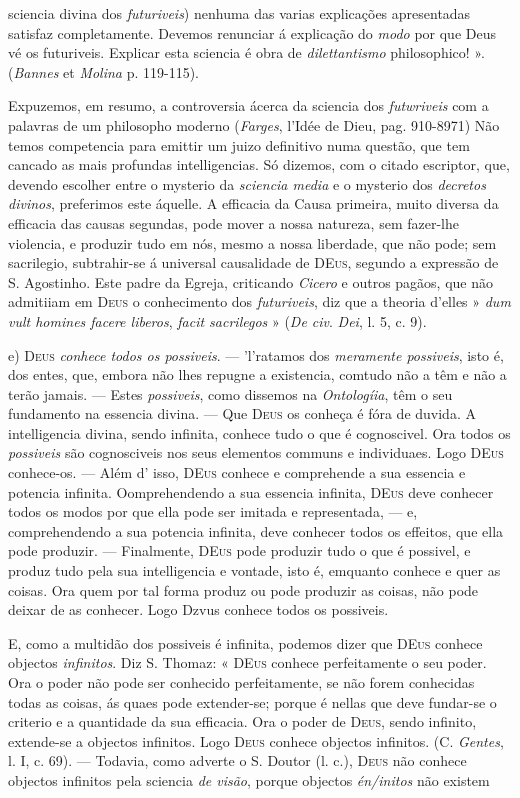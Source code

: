 sciencia divina dos \emph{futuriveis}) nenhuma das varias explicações apresentadas satisfaz completamente. Devemos renunciar á explicação do \emph{modo} por que Deus vé os futuriveis. Explicar esta sciencia é obra de \emph{dilettantismo} philosophico! ». (\emph{Bannes} et \emph{Molina} p. 119-115).\par Expuzemos, em resumo, a controversia ácerca da sciencia dos \emph{futwriveis} com a palavras de um philosopho moderno (\emph{Farges}, l'Idée de Dieu, pag. 910-8971) Não temos competencia para emittir um juizo definitivo numa questão, que tem cancado as mais profundas intelligencias. Só dizemos, com o citado escriptor, que, devendo escolher entre o mysterio da \emph{sciencia media} e o mysterio dos \emph{decretos divinos}, preferimos este áquelle. A efficacia da Causa primeira, muito diversa da efficacia das causas segundas, pode mover a nossa natureza, sem fazer-lhe violencia, e produzir tudo em nós, mesmo a nossa liberdade, que não pode; sem sacrilegio, subtrahir-se á universal causalidade de \textsc{DEus}, segundo a expressão de S. Agostinho. Este padre da Egreja, criticando \emph{Cicero} e outros pagãos, que não admitiiam em \textsc{Deus} o conhecimento dos \emph{futuriveis}, diz que a theoria d'elles » \emph{dum vult homines facere liberos}, \emph{facit sacrilegos} » (\emph{De civ}. \emph{Dei}, l. 5, c. 9).\par e) \textsc{Deus} \emph{conhece todos os possiveis}. --- 'l'ratamos dos \emph{meramente possiveis}, isto é, dos entes, que, embora não lhes repugne a existencia, comtudo não a têm e não a terão jamais. --- Estes \emph{possiveis}, como dissemos na \emph{Ontologíia}, têm o seu fundamento na essencia divina. --- Que \textsc{Deus} os conheça é fóra de duvida. A intelligencia divina, sendo infinita, conhece tudo o que é cognoscivel. Ora todos os \emph{possiveis} são cognosciveis nos seus elementos communs e individuaes. Logo \textsc{DEus} conhece-os. --- Além d' isso, \textsc{DEus} conhece e comprehende a sua essencia e potencia infinita. Oomprehendendo a sua essencia infinita, \textsc{DEus} deve conhecer todos os modos por que ella pode ser imitada e representada, --- e, comprehendendo a sua potencia infinita, deve conhecer todos os effeitos, que ella pode produzir. --- Finalmente, \textsc{DEus} pode produzir tudo o que é possivel, e produz tudo pela sua intelligencia e vontade, isto é, emquanto conhece e quer as coisas. Ora quem por tal forma produz ou pode produzir as coisas, não pode deixar de as conhecer. Logo Dzvus conhece todos os possiveis.\par E, como a multidão dos possiveis é infinita, podemos dizer que \textsc{DEus} conhece objectos \emph{infinitos}. Diz S. Thomaz: « \textsc{DEus} conhece perfeitamente o seu poder. Ora o poder não pode ser conhecido perfeitamente, se não forem conhecidas todas as coisas, ás quaes pode extender-se; porque é nellas que deve fundar-se o criterio e a quantidade da sua efficacia. Ora o poder de \textsc{Deus}, sendo infinito, extende-se a objectos infinitos. Logo \textsc{Deus} conhece objectos infinitos. (C. \emph{Gentes}, l. I, c. 69). --- Todavia, como adverte o S. Doutor (l. c.), \textsc{Deus} não conhece objectos infinitos pela sciencia \emph{de visão}, porque objectos \emph{én/initos} não existem 